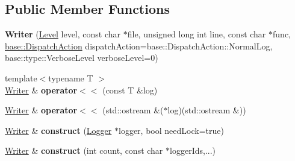 \subsection*{Public Member Functions}
\begin{DoxyCompactItemize}
\item 
\hypertarget{classel_1_1base_1_1Writer_ac2a835925f37fd2ca3da00998d8a533c}{{\bfseries Writer} (\hyperlink{namespaceel_ab0ac6091262344c52dd2d3ad099e8e36}{Level} level, const char $\ast$file, unsigned long int line, const char $\ast$func, \hyperlink{namespaceel_1_1base_a3aa2563d38e47388ba242a1694fc2839}{base\-::\-Dispatch\-Action} dispatch\-Action=base\-::\-Dispatch\-Action\-::\-Normal\-Log, base\-::type\-::\-Verbose\-Level verbose\-Level=0)}\label{classel_1_1base_1_1Writer_ac2a835925f37fd2ca3da00998d8a533c}

\item 
\hypertarget{classel_1_1base_1_1Writer_ab94f0d920c6465a57937e893aa9f5ada}{{\footnotesize template$<$typename T $>$ }\\\hyperlink{classel_1_1base_1_1Writer}{Writer} \& {\bfseries operator$<$$<$} (const T \&log)}\label{classel_1_1base_1_1Writer_ab94f0d920c6465a57937e893aa9f5ada}

\item 
\hypertarget{classel_1_1base_1_1Writer_aea6d7f996ff92e9485a76ad3955f0a29}{\hyperlink{classel_1_1base_1_1Writer}{Writer} \& {\bfseries operator$<$$<$} (std\-::ostream \&($\ast$log)(std\-::ostream \&))}\label{classel_1_1base_1_1Writer_aea6d7f996ff92e9485a76ad3955f0a29}

\item 
\hypertarget{classel_1_1base_1_1Writer_a282d82f392a3e6fef9eda47ce53e87dc}{\hyperlink{classel_1_1base_1_1Writer}{Writer} \& {\bfseries construct} (\hyperlink{classel_1_1Logger}{Logger} $\ast$logger, bool need\-Lock=true)}\label{classel_1_1base_1_1Writer_a282d82f392a3e6fef9eda47ce53e87dc}

\item 
\hypertarget{classel_1_1base_1_1Writer_ab2bc960787eb3c9b01569629dcbeb246}{\hyperlink{classel_1_1base_1_1Writer}{Writer} \& {\bfseries construct} (int count, const char $\ast$logger\-Ids,...)}\label{classel_1_1base_1_1Writer_ab2bc960787eb3c9b01569629dcbeb246}

\end{DoxyCompactItemize}
